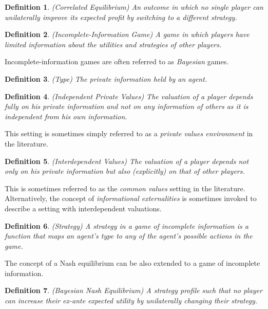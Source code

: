 \documentclass{article}
\newtheorem{definition}{Definition}
\begin{document}
\begin{definition}
(Correlated Equilibrium) An outcome in which no single player can unilaterally improve its expected profit by switching to a different strategy.
\end{definition}

\begin{definition}
(Incomplete-Information Game) A game in which players have limited information about the utilities and strategies of other players.
\end{definition}

Incomplete-information games are often referred to as \textit{Bayesian} games.

\begin{definition}
(Type) The private information held by an agent.
\end{definition}

\begin{definition}
(Independent Private Values) The valuation of a player depends fully on his private information and not on any information of others as it is independent from his own information.
\end{definition}

This setting is sometimes simply referred to as a \textit{private values environment} in the literature.

\begin{definition}
(Interdependent Values) The valuation of a player depends not only on his private information but also (explicitly) on that of other players.
\end{definition}

This is sometimes referred to as the \textit{common values} setting in the literature. Alternatively, the concept of \textit{informational externalities} is sometimes invoked to describe a setting with interdependent valuations.

\begin{definition}
(Strategy) A strategy in a game of incomplete information is a function that maps an agent's type to
any of the agent's possible actions in the game.
\end{definition}

The concept of a Nash equilibrium can be also extended to a game of incomplete information.

\begin{definition}
(Bayesian Nash Equilibrium) A strategy profile such that no player can increase their ex-ante expected utility by unilaterally changing their strategy.
\end{definition}
\end{document}
